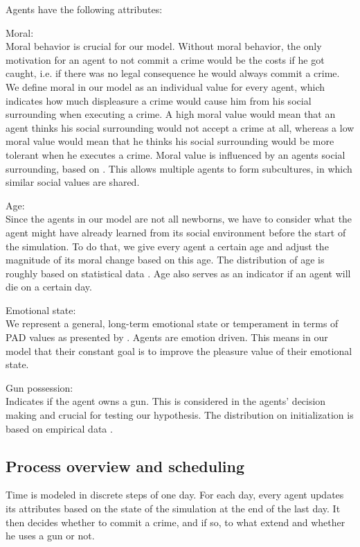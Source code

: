 \documentclass{JASSS}
\begin{document}
	Agents have the following attributes:
	\begin{itemize*}
		\item Moral:\\
			Moral behavior is crucial for our model.
			Without moral behavior, the only motivation for an agent to not commit a crime would be the costs if he got caught, i.e. if there was no legal consequence he would always commit a crime.
			We define moral in our model as an individual value for every agent, which indicates how much displeasure a crime would cause him from his social surrounding when executing a crime.
			A high moral value would mean that an agent thinks his social surrounding would not accept a crime at all, whereas a low moral value would mean that he thinks his social surrounding would be more tolerant when he executes a crime.
			Moral value is influenced by an agents social surrounding, based on \citet{sociallearning}.
			This allows multiple agents to form subcultures, in which similar social values are shared.
		\item Age:\\
			Since the agents in our model are not all newborns, we have to consider what the
			agent might have already learned from its social environment before the start of
			the simulation. To do that, we give every agent a certain age and adjust the
			magnitude of its moral change based on this age. The distribution of age is roughly based
			on statistical data \citep{lifeexpectancy}.
			Age also serves as an indicator if an agent will die on a certain day.
		\item Emotional state:\\
			We represent a general, long-term emotional state or temperament in terms of PAD
			values as presented by \citet{PAD}.
			Agents are emotion driven.
			This means in our model that their constant goal is to improve the pleasure value of their emotional state.
		\item Gun possession:\\
			Indicates if the agent owns a gun. This is considered in the agents' decision
			making and crucial for testing our hypothesis. The distribution on initialization
			is based on empirical data \citep{gunpos}.
	\end{itemize*}

	\subsection{Process overview and scheduling}
		Time is modeled in discrete steps of one day. For each day, every agent
		updates its attributes based on the state of the simulation at the end of the last day.
		It then decides whether to commit a crime, and if so, to what extend and whether he uses a gun or not.
\end{document}
